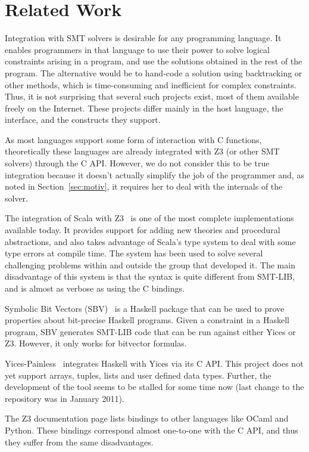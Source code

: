 \section{Related Work}
Integration with SMT solvers is desirable for any programming
language. It enables programmers in that language to use their power
to solve logical constraints arising in
a program, and use the solutions obtained in the rest of the
program. The alternative would be to hand-code a solution
using backtracking or other methods, which is time-consuming and
inefficient for complex constraints. Thus, it is not
surprising that several such projects exist, most of them
available freely on the Internet. These projects differ
mainly in the host language, the interface, and
the constructs they support.

As most languages support some
form of interaction with C functions, theoretically these
languages are already integrated with Z3 (or other SMT
solvers) through the C API. However, we do not consider
this to be true integration because it doesn't actually simplify the job
of the programmer and, as noted in Section~\ref{sec:motiv}, it
requires her to deal with the internals of the solver.

The integration of Scala with Z3~\cite{scalaz3} is one of the
most complete implementations available today. It provides support for adding
new theories and procedural abstractions, and also takes advantage
of Scala's
type system to deal with some type errors at compile time.
The system has been used to solve several challenging problems
within and outside the group that developed it. The main
disadvantage of this system is that the syntax is quite different from
SMT-LIB, and is almost as verbose as using the C bindings.

Symbolic Bit Vectors (SBV)~\cite{sbv} is a Haskell package that can
be used to prove properties about
bit-precise Haskell programs. Given a constraint in a Haskell
program, SBV generates SMT-LIB code that can be run against
either Yices or Z3.  However, it only works for bitvector formulas.

Yices-Painless~\cite{yices-painless} integrates Haskell with Yices
via its C API. This project
does not yet support arrays, tuples, lists and user defined
data types. Further, the development of the tool seems to
be stalled for some time now (last change to the repository
was in January 2011).

The Z3 documentation page lists bindings
to other languages like OCaml and Python. These bindings correspond
almost one-to-one with the C API, and thus they suffer from the same
disadvantages.
